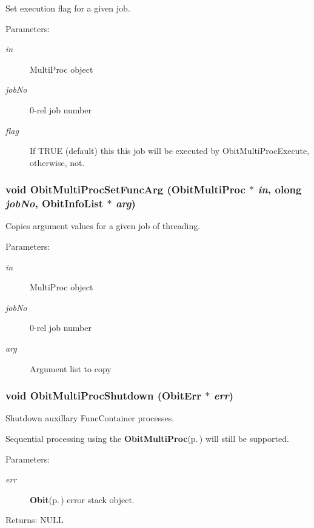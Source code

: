 Set execution flag for a given job. 

\begin{Desc}
\item[Parameters:]
\begin{description}
\item[{\em in}]Multi\-Proc object \item[{\em job\-No}]0-rel job number \item[{\em flag}]If TRUE (default) this this job will be executed by Obit\-Multi\-Proc\-Execute, otherwise, not. \end{description}
\end{Desc}
\subsubsection{\setlength{\rightskip}{0pt plus 5cm}void Obit\-Multi\-Proc\-Set\-Func\-Arg ({\bf Obit\-Multi\-Proc} $\ast$ {\em in}, {\bf olong} {\em job\-No}, {\bf Obit\-Info\-List} $\ast$ {\em arg})}\label{ObitMultiProc_8h_a10}


Copies argument values for a given job of threading. 

\begin{Desc}
\item[Parameters:]
\begin{description}
\item[{\em in}]Multi\-Proc object \item[{\em job\-No}]0-rel job number \item[{\em arg}]Argument list to copy \end{description}
\end{Desc}
\subsubsection{\setlength{\rightskip}{0pt plus 5cm}void Obit\-Multi\-Proc\-Shutdown ({\bf Obit\-Err} $\ast$ {\em err})}\label{ObitMultiProc_8h_a9}


Shutdown auxillary Func\-Container processes. 

Sequential processing using the {\bf Obit\-Multi\-Proc}{\rm (p.\,\pageref{structObitMultiProc})} will still be supported. \begin{Desc}
\item[Parameters:]
\begin{description}
\item[{\em err}]{\bf Obit}{\rm (p.\,\pageref{structObit})} error stack object. \end{description}
\end{Desc}
\begin{Desc}
\item[Returns:]NULL \end{Desc}
